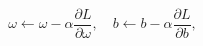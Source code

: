 \begin{equation}
    \omega \leftarrow \omega - \alpha \frac {\partial L}{\partial \omega},
    \quad
    b \leftarrow b - \alpha \frac {\partial L}{\partial b},
    \label{eq:update}
\end{equation}